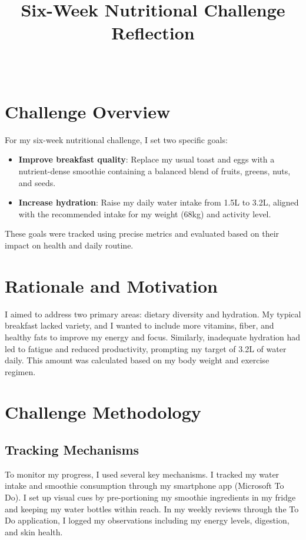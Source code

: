 \documentclass[11pt]{article}
\title{Six-Week Nutritional Challenge Reflection}
\author{\fontsize{9.5}{0}\selectfont{\underline{Name and Student Identification}: Arfaz Hossain, V00984826}\\
        \fontsize{9.5}{0}\selectfont{\underline{Date of Submission}: November 28, 2024}}
\date{}
\begin{document}
\maketitle
{}
\vspace{-3em}

\section*{Challenge Overview}\vspace{-1em}
For my six-week nutritional challenge, I set two specific goals:
\begin{itemize}
    \item \textbf{Improve breakfast quality}: Replace my usual toast and eggs with a nutrient-dense smoothie containing a balanced blend of fruits, greens, nuts, and seeds.
    \item \textbf{Increase hydration}: Raise my daily water intake from 1.5L to 3.2L, aligned with the recommended intake for my weight (68kg) and activity level.
\end{itemize}
These goals were tracked using precise metrics and evaluated based on their impact on health and daily routine.

\section*{Rationale and Motivation}\vspace{-1em}
I aimed to address two primary areas: dietary diversity and hydration. My typical breakfast lacked variety, and I wanted to include more vitamins, fiber, and healthy fats to improve my energy and focus. Similarly, inadequate hydration had led to fatigue and reduced productivity, prompting my target of 3.2L of water daily. This amount was calculated based on my body weight and exercise regimen.

\section*{Challenge Methodology}\vspace{-1em}
\subsection*{Tracking Mechanisms}\vspace{-1.2em}
To monitor my progress, I used several key mechanisms. I tracked my water intake and smoothie consumption through my smartphone app (Microsoft To Do). I set up visual cues by pre-portioning my smoothie ingredients in my fridge and keeping my water bottles within reach. In my weekly reviews through the To Do application, I logged my observations including my energy levels, digestion, and skin health.
\end{document}
